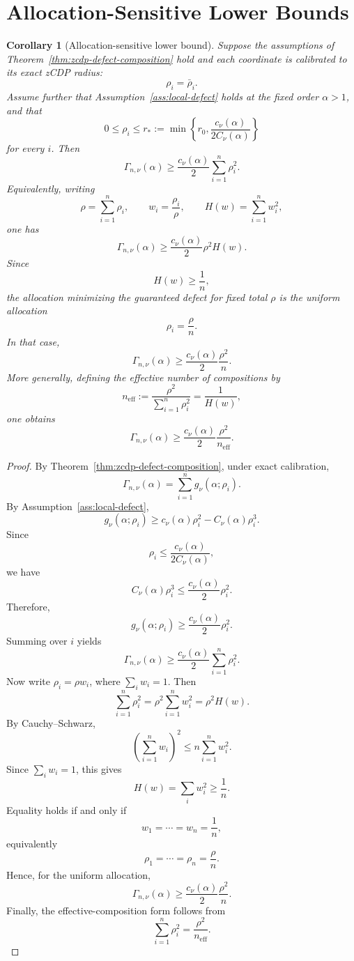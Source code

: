 \documentclass[11pt]{article}
\newtheorem{corollary}{Corollary}
\begin{document}
\section{Allocation-Sensitive Lower Bounds}

\begin{corollary}[Allocation-sensitive lower bound]
\label{cor:allocation-lower-bound}
Suppose the assumptions of Theorem~\ref{thm:zcdp-defect-composition} hold and
each coordinate is calibrated to its exact zCDP radius:
\[
\rho_i=\bar\rho_i.
\]
Assume further that Assumption~\ref{ass:local-defect} holds at the fixed order
\(\alpha>1\), and that
\[
0\le \rho_i\le r_*
:=
\min\left\{r_0,\frac{c_\nu(\alpha)}{2C_\nu(\alpha)}\right\}
\]
for every \(i\). Then
\[
\Gamma_{n,\nu}(\alpha)
\ge
\frac{c_\nu(\alpha)}{2}
\sum_{i=1}^n \rho_i^2.
\]
Equivalently, writing
\[
\rho=\sum_{i=1}^n \rho_i,
\qquad
w_i=\frac{\rho_i}{\rho},
\qquad
H(w)=\sum_{i=1}^n w_i^2,
\]
one has
\[
\Gamma_{n,\nu}(\alpha)
\ge
\frac{c_\nu(\alpha)}{2}\rho^2H(w).
\]
Since
\[
H(w)\ge \frac1n,
\]
the allocation minimizing the guaranteed defect for fixed total \(\rho\) is the
uniform allocation
\[
\rho_i=\frac{\rho}{n}.
\]
In that case,
\[
\Gamma_{n,\nu}(\alpha)
\ge
\frac{c_\nu(\alpha)}{2}\frac{\rho^2}{n}.
\]
More generally, defining the effective number of compositions by
\[
n_{\mathrm{eff}}
:=
\frac{\rho^2}{\sum_{i=1}^n\rho_i^2}
=
\frac1{H(w)},
\]
one obtains
\[
\Gamma_{n,\nu}(\alpha)
\ge
\frac{c_\nu(\alpha)}{2}
\frac{\rho^2}{n_{\mathrm{eff}}}.
\]
\end{corollary}

\begin{proof}
By Theorem~\ref{thm:zcdp-defect-composition}, under exact calibration,
\[
\Gamma_{n,\nu}(\alpha)
=
\sum_{i=1}^n g_\nu(\alpha;\rho_i).
\]
By Assumption~\ref{ass:local-defect},
\[
g_\nu(\alpha;\rho_i)
\ge
c_\nu(\alpha)\rho_i^2-C_\nu(\alpha)\rho_i^3.
\]
Since
\[
\rho_i\le \frac{c_\nu(\alpha)}{2C_\nu(\alpha)},
\]
we have
\[
C_\nu(\alpha)\rho_i^3
\le
\frac{c_\nu(\alpha)}{2}\rho_i^2.
\]
Therefore,
\[
g_\nu(\alpha;\rho_i)
\ge
\frac{c_\nu(\alpha)}{2}\rho_i^2.
\]
Summing over \(i\) yields
\[
\Gamma_{n,\nu}(\alpha)
\ge
\frac{c_\nu(\alpha)}{2}
\sum_{i=1}^n \rho_i^2.
\]
Now write \(\rho_i=\rho w_i\), where \(\sum_i w_i=1\). Then
\[
\sum_{i=1}^n \rho_i^2
=
\rho^2\sum_{i=1}^n w_i^2
=
\rho^2H(w).
\]
By Cauchy--Schwarz,
\[
\left(\sum_{i=1}^n w_i\right)^2
\le
n\sum_{i=1}^n w_i^2.
\]
Since \(\sum_i w_i=1\), this gives
\[
H(w)=\sum_i w_i^2\ge \frac1n.
\]
Equality holds if and only if
\[
w_1=\cdots=w_n=\frac1n,
\]
equivalently
\[
\rho_1=\cdots=\rho_n=\frac{\rho}{n}.
\]
Hence, for the uniform allocation,
\[
\Gamma_{n,\nu}(\alpha)
\ge
\frac{c_\nu(\alpha)}{2}\frac{\rho^2}{n}.
\]
Finally, the effective-composition form follows from
\[
\sum_{i=1}^n \rho_i^2
=
\frac{\rho^2}{n_{\mathrm{eff}}}.
\]
\end{proof}
\end{document}
